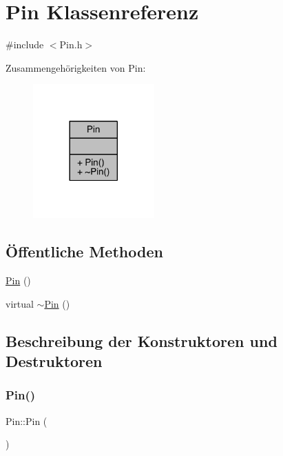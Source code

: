 \hypertarget{class_pin}{}\section{Pin Klassenreferenz}
\label{class_pin}


{\ttfamily \#include $<$Pin.\+h$>$}



Zusammengehörigkeiten von Pin\+:
\nopagebreak
\begin{figure}[H]
\begin{center}
\leavevmode
\includegraphics[width=132pt]{class_pin__coll__graph}
\end{center}
\end{figure}
\subsection*{Öffentliche Methoden}
\begin{DoxyCompactItemize}
\item 
\hyperlink{class_pin_aaf3d92065cd9b9de91f01164bec418ea}{Pin} ()
\item 
virtual \hyperlink{class_pin_a462c14c45d3d653731dde638aa6e7bb7}{$\sim$\+Pin} ()
\end{DoxyCompactItemize}


\subsection{Beschreibung der Konstruktoren und Destruktoren}
\hypertarget{class_pin_aaf3d92065cd9b9de91f01164bec418ea}{}\label{class_pin_aaf3d92065cd9b9de91f01164bec418ea} 
\subsubsection{\texorpdfstring{Pin()}{Pin()}}
{\footnotesize\ttfamily Pin\+::\+Pin (\begin{DoxyParamCaption}{ }\end{DoxyParamCaption})}

